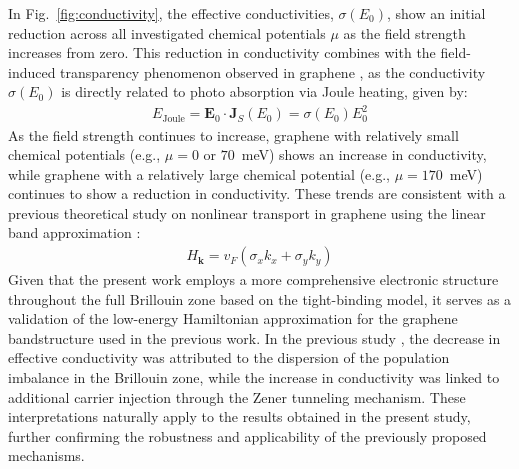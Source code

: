 In Fig.~\ref{fig:conductivity}, the effective conductivities, $\sigma(E_0)$, show an initial
reduction across all investigated chemical potentials $\mu$ as the field strength increases from
zero. This reduction in conductivity combines with the field-induced transparency phenomenon observed
in graphene \cite{sato2021nonlinear}, as the conductivity $\sigma(E_0)$ is directly related to
photo absorption via Joule heating, given by:
\begin{align}
	E_{\mathrm{Joule}}=\mathbf E_0 \cdot \mathbf J_S(E_0)=\sigma(E_0)E^2_0
\end{align}
As the field strength continues to increase, graphene with relatively small chemical potentials (e.g., $\mu=0$ or $70$~meV) shows an increase in conductivity, while graphene with a relatively large chemical potential (e.g., $\mu=170$~meV) continues to show a reduction in conductivity. These trends are consistent with a previous theoretical study on nonlinear transport in graphene using the linear band approximation \cite{sato2021nonlinear}:
\begin{align}
	H_{\mathbf k}=v_F\left (\sigma_x k_x +\sigma_y k_y \right)
\end{align}
Given that the present work employs a more comprehensive electronic structure throughout the full Brillouin zone based on the tight-binding model, it serves as a validation of the low-energy Hamiltonian approximation for the graphene bandstructure used in the previous work. In the previous study \cite{sato2021nonlinear}, the decrease in effective conductivity was attributed to the dispersion of the population imbalance in the Brillouin zone, while the increase in conductivity was linked to additional carrier injection through the Zener tunneling mechanism. These interpretations naturally apply to the results obtained in the present study, further confirming the robustness and applicability of the previously proposed mechanisms.
